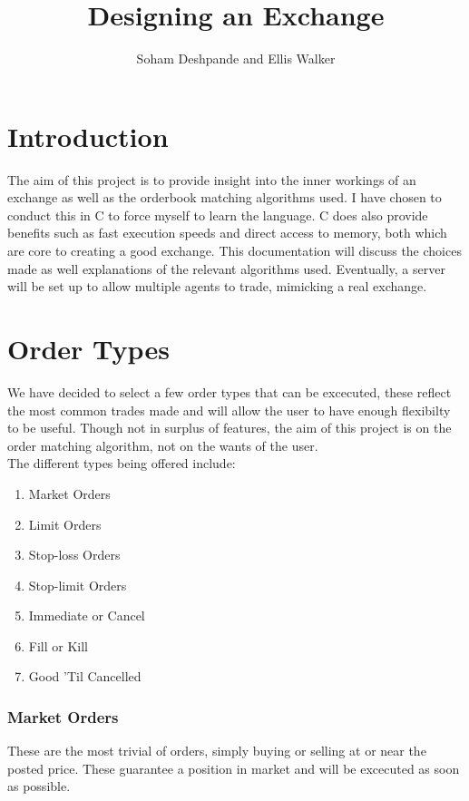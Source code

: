 \documentclass[12pt]{article}
\theoremstyle{definition}
\begin{document}
\title{Designing an Exchange}
\author{Soham Deshpande and Ellis Walker}
\maketitle
\clearpage

\tableofcontents

\clearpage
\section{Introduction}
The aim of this project is to provide insight into the inner workings of an 
exchange as well as the orderbook matching algorithms used. I have chosen
to conduct this in C to force myself to learn the language. C does also provide
benefits such as fast execution speeds and direct access to memory, both which
are core to creating a good exchange. This documentation will discuss the 
choices made as well explanations of the relevant algorithms used. Eventually,
a server will be set up to allow multiple agents to trade, mimicking a real
exchange. 
  

\section{Order Types}
We have decided to select a few order types that can be excecuted, these reflect
the most common trades made and will allow the user to have enough flexibilty
to be useful. Though not in surplus of features, the aim of this project is on
the order matching algorithm, not on the wants of the user.
\\
The different types being offered include:
\begin{enumerate}
  \item Market Orders
  \item Limit Orders
  \item Stop-loss Orders
  \item Stop-limit Orders
  \item Immediate or Cancel
  \item Fill or Kill
  \item Good 'Til Cancelled
\end{enumerate}

\subsubsection{Market Orders}
These are the most trivial of orders, simply buying or selling at or near the 
posted price. These guarantee a position in market and will be excecuted as 
soon as possible. 
\end{document}

